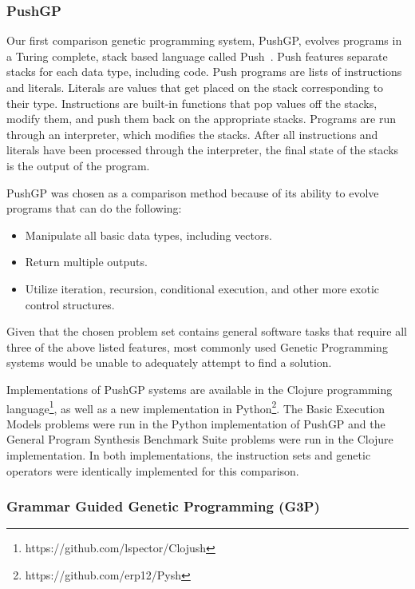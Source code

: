 \subsubsection{PushGP}

Our first comparison genetic programming system, PushGP, evolves programs in a Turing complete, stack based language called Push~\cite{Spector2002, Spector2005}. Push features separate stacks for each data type, including code. Push programs are lists of instructions and literals. Literals are values that get placed on the stack corresponding to their type. Instructions are built-in functions that pop values off the stacks, modify them, and push them back on the appropriate stacks. Programs are run through an interpreter, which modifies the stacks. After all instructions and literals have been processed through the interpreter, the final state of the stacks is the output of the program.

PushGP was chosen as a comparison method because of its ability to evolve programs that can do the following:
\begin{itemize}
\item Manipulate all basic data types, including vectors.
\item Return multiple outputs.
\item Utilize iteration, recursion, conditional execution, and other more exotic control structures.
\end{itemize}

Given that the chosen problem set contains general software tasks that require all three of the above listed features, most commonly used Genetic Programming systems would be unable to adequately attempt to find a solution.

Implementations of PushGP systems are available in the Clojure programming language\footnote{https://github.com/lspector/Clojush}, as well as a new implementation in Python\footnote{https://github.com/erp12/Pysh}. The Basic Execution Models problems were run in the Python implementation of PushGP and the General Program Synthesis Benchmark Suite problems were run in the Clojure implementation. In both implementations, the instruction sets and genetic operators were identically implemented for this comparison.

\subsubsection{Grammar Guided Genetic Programming (G3P)}

